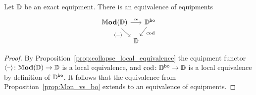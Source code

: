 \documentclass[11pt,oneside,article]{memoir}
\begin{document}
\begin{theorem}
      \label{thm:Mod_vs_bo}
   Let $\mathbb{D}$ be an exact equipment. There is an equivalence of equipments
   \[ \begin{tikzcd}[row sep=2.5ex, column sep=0em]
      \dMod(\dcat{D}) \ar[rr,"\equiv"]\ar[rd,"\Col{-}"' pos=.3] && \dcat{D}^{\bo}\ar[ld,"\cod" pos=.3]\\
      &\dcat{D}
   \end{tikzcd} \]
\end{theorem}
\begin{proof}
   By Proposition~\ref{prop:collapse_local_equivalence} the equipment functor $\langle\textrm{--}\rangle\colon\mathbb{M}\mathbf{od}(\mathbb{D})\to\mathbb{D}$ is a local equivalence, and $\operatorname{cod}\colon\mathbb{D}^{\mathsf{bo}}\to\mathbb{D}$ is a local equivalence by definition of $\mathbb{D}^{\mathsf{bo}}$. It follows that the equivalence from Proposition~\ref{prop:Mon_vs_bo} extends to an equivalence of equipments.
\end{proof}
\end{document}

